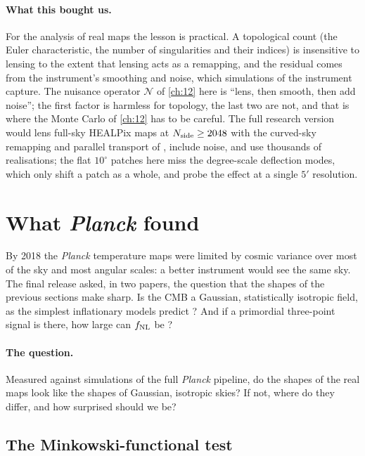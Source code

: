\paragraph{What this bought us.} For the analysis of real maps the lesson is practical. A topological count (the Euler characteristic, the number of singularities and their indices) is insensitive to lensing to the extent that lensing acts as a remapping, and the residual comes from the instrument's smoothing and noise, which simulations of the instrument capture. The nuisance operator $\mathcal N$ of \cref{ch:12} here is ``lens, then smooth, then add noise''; the first factor is harmless for topology, the last two are not, and that is where the Monte Carlo of \cref{ch:12} has to be careful. The full research version would lens full-sky HEALPix maps at $N_{\rm side}\geq2048$ with the curved-sky remapping and parallel transport of \cite{ChallinorChon2002}, include noise, and use thousands of realisations; the flat $10^\circ$ patches here miss the degree-scale deflection modes, which only shift a patch as a whole, and probe the effect at a single $5'$ resolution.
\section{What \textit{Planck} found}
\label{T3a:sec:planck}

By 2018 the \textit{Planck} temperature maps were limited by cosmic variance over most of the sky and most angular scales: a better instrument would see the same sky. The final release asked, in two papers, the question that the shapes of the previous sections make sharp. Is the CMB a Gaussian, statistically isotropic field, as the simplest inflationary models predict \cite{Planck2018VII}? And if a primordial three-point signal is there, how large can $f_{\rm NL}$ be \cite{Planck2018IX}?

\paragraph{The question.} Measured against simulations of the full \textit{Planck} pipeline, do the shapes of the real maps look like the shapes of Gaussian, isotropic skies? If not, where do they differ, and how surprised should we be?

\subsection{The Minkowski-functional test}
\label{T3a:sec:planck-mf}

